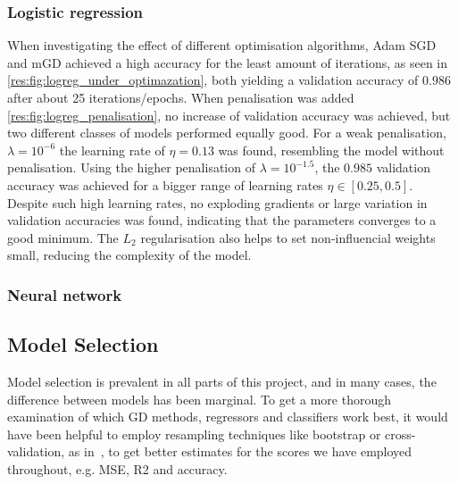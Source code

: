         \subsubsection{Logistic regression}
        When investigating the effect of different optimisation algorithms, Adam SGD and mGD achieved a high accuracy for the least amount of iterations, as seen in \cref{res:fig:logreg_under_optimazation}, both yielding a validation accuracy of $0.986$ after about 25 iterations/epochs. When penalisation was added \cref{res:fig:logreg_penalisation}, no increase of validation accuracy was achieved, but two different classes of models performed equally good. For a weak penalisation, $\lambda = 10^{-6}$ the learning rate of $\eta = 0.13$ was found, resembling the model without penalisation. Using the higher penalisation of $\lambda = 10^{-1.5}$, the $0.985$ validation accuracy was achieved for a bigger range of learning rates $\eta \in [0.25, 0.5]$. Despite such high learning rates, no exploding gradients or large variation in validation accuracies was found, indicating that the parameters converges to a good minimum. The $L_2$ regularisation also helps to set non-influencial weights small, reducing the complexity of the model.

        \subsubsection{Neural network}

\subsection{Model Selection}
    Model selection is prevalent in all parts of this project, and in many cases, the difference between models has been marginal. To get a more thorough examination of which GD methods, regressors and classifiers work best, it would have been helpful to employ resampling techniques like bootstrap or cross-validation, as in~\citep{Project1}, to get better estimates for the scores we have employed throughout, e.g. MSE, R2 and accuracy.